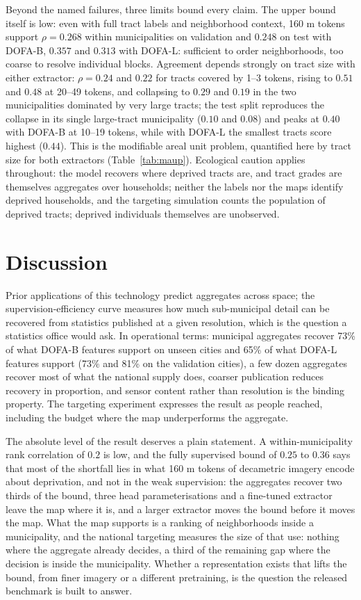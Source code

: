 \documentclass[11pt]{article}
\begin{document}
Beyond the named failures, three limits bound every claim. The upper bound itself is
low: even with full tract labels and neighborhood context, 160 m tokens support
$\rho = 0.268$ within municipalities on validation and $0.248$ on test with DOFA-B,
$0.357$ and $0.313$ with DOFA-L: sufficient to order neighborhoods, too coarse to
resolve individual blocks. Agreement depends strongly on tract size with either
extractor: $\rho = 0.24$ and $0.22$ for tracts covered by 1--3 tokens, rising to $0.51$
and $0.48$ at 20--49 tokens, and collapsing to $0.29$ and $0.19$ in the two
municipalities dominated by very large tracts; the test split reproduces the collapse
in its single large-tract municipality ($0.10$ and $0.08$) and peaks at $0.40$ with
DOFA-B at 10--19 tokens, while with DOFA-L the smallest tracts score highest ($0.44$).
This is the
modifiable areal unit problem, quantified here by tract size for both extractors
(Table~\ref{tab:maup}). Ecological caution applies throughout: the model recovers where
deprived tracts are, and tract grades are themselves aggregates over households;
neither the labels nor the maps identify deprived households, and the targeting
simulation counts the population of deprived tracts; deprived individuals themselves
are unobserved.




\section{Discussion}

Prior applications of this technology predict aggregates across space; the
supervision-efficiency curve measures how much sub-municipal detail can be recovered
from statistics published at a given resolution, which is the question a statistics
office would ask. In operational terms: municipal aggregates recover 73\% of what
DOFA-B features support on unseen cities and 65\% of what DOFA-L features support (73\%
and 81\% on the validation cities), a few dozen aggregates recover most of what the
national supply does, coarser publication reduces recovery in proportion, and sensor
content rather than resolution is the binding property. The targeting experiment
expresses the result as people reached, including the budget where the map underperforms
the aggregate.

The absolute level of the result deserves a plain statement. A within-municipality rank
correlation of $0.2$ is low, and the fully supervised bound of $0.25$ to $0.36$ says
that most of the shortfall lies in what 160 m tokens of decametric imagery encode about
deprivation, and not in the weak supervision: the aggregates recover two thirds of the
bound, three head parameterisations and a fine-tuned extractor leave the map where it
is, and a larger extractor moves the bound before it moves the map. What the map
supports is a ranking of neighborhoods inside a municipality, and the national
targeting measures the size of that use: nothing where the aggregate already decides,
a third of the remaining gap where the decision is inside the municipality. Whether a
representation exists that lifts the bound, from finer imagery or a different
pretraining, is the question the released benchmark is built to answer.
\end{document}
